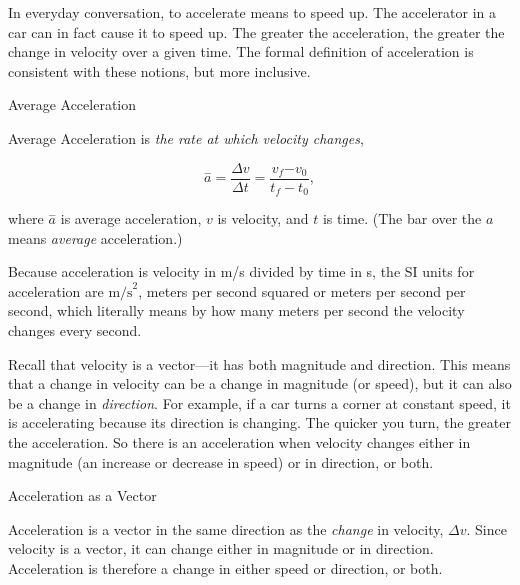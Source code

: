 \documentclass[
]{book}
\newenvironment{note}{}{}
\begin{document}
In everyday conversation, to accelerate means to speed up. The
accelerator in a car can in fact cause it to speed up. The greater the
\protect\hypertarget{import-auto-id1298945}{}{acceleration}, the greater the
change in velocity over a given time. The formal definition of
acceleration is consistent with these notions, but more inclusive.

\hypertarget{fs-id4053362}{}
\begin{note}

Average Acceleration

\protect\hypertarget{import-auto-id2580108}{}{Average Acceleration} is \emph{the
rate at which velocity changes},

\leavevmode\hypertarget{import-auto-id4040806}{}%
\[{{{\overset{-}{a} = \frac{\Delta v}{\Delta t}} = \frac{v_{f}{- v_{0}}}{t_{f} - t_{0}}},}{}\]

where \emph{\(\overset{-}{a}{}\)} is average acceleration, \emph{\(v{}\)} is velocity,
and \emph{\(t{}\)} is time. (The bar over the \(a{}\) means \emph{average}
acceleration.)

\end{note}

Because acceleration is velocity in m/s divided by time in s, the SI
units for acceleration are \(\text{m/s}^{2}{}\), meters per second squared
or meters per second per second, which literally means by how many
meters per second the velocity changes every second.

Recall that velocity is a vector---it has both magnitude and direction.
This means that a change in velocity can be a change in magnitude (or
speed), but it can also be a change in \emph{direction}. For example, if a
car turns a corner at constant speed, it is accelerating because its
direction is changing. The quicker you turn, the greater the
acceleration. So there is an acceleration when velocity changes either
in magnitude (an increase or decrease in speed) or in direction, or
both.

\hypertarget{fs-id3524141}{}
\begin{note}

Acceleration as a Vector

Acceleration is a vector in the same direction as the \emph{change} in
velocity, \({\Delta v}{}\). Since velocity is a vector, it can change
either in magnitude or in direction. Acceleration is therefore a change
in either speed or direction, or both.

\end{note}
\end{document}

